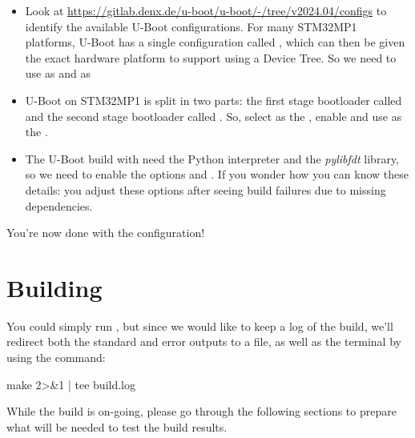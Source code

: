 \begin{itemize}
\begin{itemize}
  \item Look at
    \url{https://gitlab.denx.de/u-boot/u-boot/-/tree/v2024.04/configs}
    to identify the available U-Boot configurations. For many STM32MP1
    platforms, U-Boot has a single configuration called
    , which can then be given the exact
    hardware platform to support using a Device Tree. So we need to
    use  as  and
     as 

  \item U-Boot on STM32MP1 is split in two parts: the first stage
    bootloader called  and the second stage
    bootloader called . So, select 
    as the , enable  and use  as the
    .

  \item The U-Boot build with need the Python interpreter and the {\em
      pylibfdt} library, so we need to enable the options  and . If you
    wonder how you can know these details: you adjust these options
    after seeing build failures due to missing dependencies.

  \end{itemize}

\end{itemize}

You're now done with the configuration!

\section{Building}

You could simply run , but since we would like to keep a
log of the build, we'll redirect both the standard and error outputs
to a file, as well as the terminal by using the  command:

\begin{bashinput}
make 2>&1 | tee build.log
\end{bashinput}

While the build is on-going, please go through the following sections
to prepare what will be needed to test the build results.



